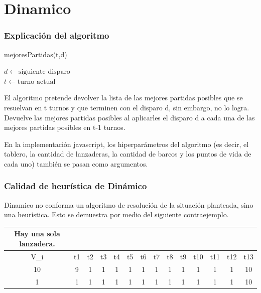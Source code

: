 \documentclass{article}
\begin{document}
\part{Dinamico}
\section{Explicación del algoritmo}

\begin{algorithm}
\caption{mejoresPartidas(t,d)}
    $d \leftarrow \text{siguiente disparo}$ \\
    $t \leftarrow \text{turno actual}$ \\
\end{algorithm}

El algoritmo pretende devolver la lista de las mejores partidas posibles que se resuelvan en t turnos y que terminen con el disparo d, sin embargo, no lo logra. Devuelve las mejores partidas posibles al aplicarles el disparo d a cada una de las mejores partidas posibles en t-1 turnos.

En la implementación javascript, los hiperparámetros del algoritmo (es decir, el tablero, la cantidad de lanzaderas, la cantidad de barcos y los puntos de vida de cada uno) también se pasan como argumentos.

\section{Calidad de heurística de Dinámico}

Dinamico no conforma un algoritmo de resolución de la situación planteada, sino una heurística. Esto se demuestra por medio del siguiente contraejemplo.

\begin{center}
\begin{tabular}{ c | c c c c c c c c c c c c c}
Hay una sola lanzadera. \\
\hline
V\_i & t1 & t2 & t3 & t4 & t5 & t6 & t7 & t8 & t9 & t10 & t11 & t12 & t13 \\
\hline
10    &  9 &  1 &  1 &  1 &  1 &  1 & 1 &  1 &  1 &  1 &  1 & 1  & 10 \\
1     &  1 &  1 &  1 &  1 &  1 &  1 & 1 &  1 &  1 &  1 &  1 & 1  & 10
\end{tabular}
\end{center}
\end{document}
